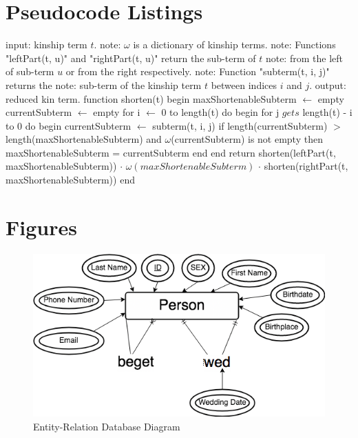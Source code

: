 \appendix
\chapter{Pseudocode Listings}
\begin{algorithm}[caption={Kinship Term Reduction}, label={algo:red}]
    input: kinship term $t$.
    note: $\omega$ is a dictionary of kinship terms.
    note: Functions "leftPart(t, u)" and "rightPart(t, u)" return the sub-term of $t$
    note: from the left of sub-term $u$ or from the right respectively.
    note: Function "subterm(t, i, j)" returns the
    note: sub-term of the kinship term $t$ between indices $i$ and $j$.
    output: reduced kin term.
    function shorten(t)
    begin
        maxShortenableSubterm $\gets$ empty
        currentSubterm $\gets$ empty
        for i $\gets$ 0 to length(t) do
        begin
            for j $gets$ length(t) - i to 0 do
            begin
                currentSubterm $\gets$ subterm(t, i, j)
                if length(currentSubterm) $>$ length(maxShortenableSubterm)
                    and $\omega$(currentSubterm) is not empty
                then
                    maxShortenableSubterm = currentSubterm
            end
        end
        return shorten(leftPart(t, maxShortenableSubterm))
               $\cdot$ $\omega(maxShortenableSubterm)$
               $\cdot$ shorten(rightPart(t, maxShortenableSubterm))
    end
\end{algorithm}

\chapter{Figures}
\begin{figure}[h!]
    \centering
    \includegraphics[width=\linewidth]{figs/entity.png}
    \caption{Entity-Relation Database Diagram}
    \label{fig:er}
\end{figure}

